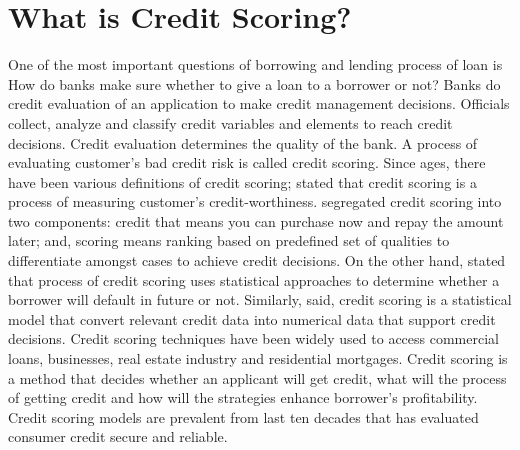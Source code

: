 {\section{What is Credit Scoring?}\label{C.risk}
One of the most important questions of borrowing and lending process of loan is How do banks make sure whether to give a loan to a borrower or not? Banks do credit evaluation of an application to make credit management decisions. Officials collect, analyze and classify credit variables and elements to reach credit decisions. Credit evaluation determines the quality of the bank. A process of evaluating customer's bad credit risk is called credit scoring. Since ages, there have been various definitions of credit scoring; \citet{hand1998consumer} stated that credit scoring is a process of measuring customer's credit-worthiness. \citep{anderson2007credit} segregated credit scoring into two components: credit that means you can purchase now and repay the amount later; and, scoring means ranking based on predefined set of qualities to differentiate amongst cases to achieve credit decisions. On the other hand, \citet{gup2005commercial} stated that process of credit scoring uses statistical approaches to determine whether a borrower will default in future or not. Similarly, \citet{beynon2005optimizing} said, credit scoring is a statistical model that convert relevant credit data into numerical data that support credit decisions. \citep{gup2005commercial} Credit scoring techniques have been widely used to access commercial loans, businesses, real estate industry and residential mortgages. \citep{thomas2002credit} Credit scoring is a method that decides whether an applicant will get credit, what will the process of getting credit and how will the strategies enhance borrower's profitability. Credit scoring models are prevalent from last ten decades that has evaluated consumer credit secure and reliable. 

}
